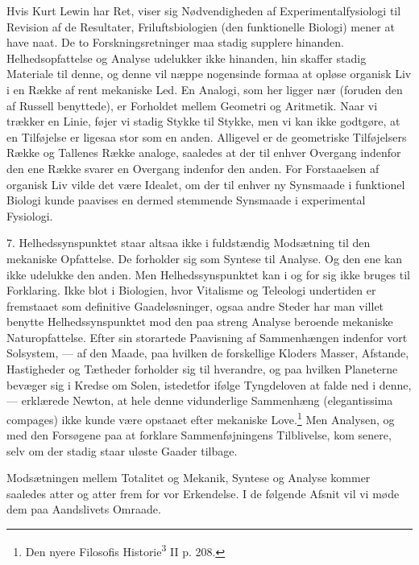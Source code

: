 \documentclass[12pt]{article}
\newcommand{\opage}[1]{\marginnote{\footnotesize\textit{[#1]}}}
\begin{document}
Hvis Kurt Lewin har Ret, viser sig Nødvendigheden af
Experimentalfysiologi til Revision af de Resultater,
Friluftsbiologien (den funktionelle Biologi) mener at have
naat. De to Forskningsretninger maa stadig supplere hinanden.
Helhedsopfattelse og Analyse udelukker ikke hinanden, hin skaffer
stadig Materiale til denne, og denne vil næppe nogensinde formaa at
opløse organisk Liv i en Række af rent mekaniske Led. En Analogi, som
her ligger nær (foruden den af Russell benyttede), er Forholdet mellem
Geometri og Aritmetik. Naar vi trækker en Linie, føjer vi stadig
Stykke til Stykke, men vi kan ikke godtgøre, at en Tilføjelse er
ligesaa stor som en anden. Alligevel er de geometriske Tilføjelsers
Række og Tallenes Række analoge, saaledes at der til enhver Overgang
indenfor den ene Række svarer en Overgang indenfor den anden. For
Forstaaelsen af organisk Liv vilde det være Idealet, om der til
enhver ny Synsmaade i funktionel Biologi kunde paavises en dermed
stemmende Synsmaade i experimental Fysiologi.

7. Helhedssynspunktet staar altsaa ikke i fuldstændig
\setcounter{footnote}{0}%
\opage{27}Modsætning til den mekaniske Opfattelse. De forholder sig som
Syntese til Analyse. Og den ene kan ikke udelukke den anden. Men
Helhedssynspunktet kan i og for sig ikke bruges til Forklaring. Ikke
blot i Biologien, hvor Vitalisme og Teleologi undertiden er fremstaaet
som definitive Gaadeløsninger, ogsaa andre Steder har man villet
benytte Helhedssynspunktet mod den paa streng Analyse beroende
mekaniske Naturopfattelse. Efter sin storartede Paavisning af
Sammenhængen indenfor vort Solsystem, --- af den Maade, paa hvilken de
forskellige Kloders Masser, Afstande, Hastigheder og Tætheder forholder
sig til hverandre, og paa hvilken Planeterne bevæger sig i Kredse om
Solen, istedetfor ifølge Tyngdeloven at falde ned i denne, --- erklærede
Newton, at hele denne vidunderlige Sammenhæng (elegantissima compages)
ikke kunde være opstaaet efter mekaniske Love.\footnote{Den nyere
Filosofis Historie\textsuperscript{3} II p. 208.} Men Analysen, og med
den Forsøgene paa at forklare Sammenføjningens Tilblivelse, kom senere,
selv om der stadig staar uløste Gaader tilbage.

Modsætningen mellem Totalitet og Mekanik, Syntese og Analyse kommer
saaledes atter og atter frem for vor Erkendelse. I de følgende Afsnit
vil vi møde dem paa Aandslivets Omraade.
\end{document}
